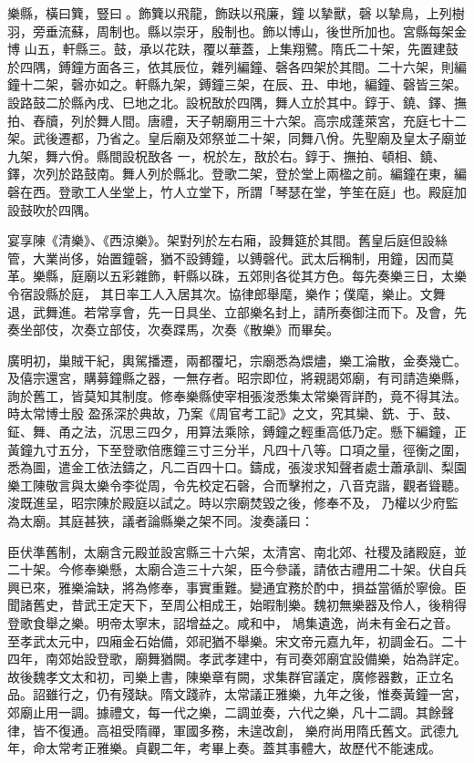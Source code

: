 \begin{pinyinscope}
 樂縣，橫曰簨，豎曰。飾簨以飛龍，飾趺以飛廉，鐘以摯獸，磬以摯鳥，上列樹羽，旁垂流蘇，周制也。縣以崇牙，殷制也。飾以博山，後世所加也。宮縣每架金博
 山五，軒縣三。鼓，承以花趺，覆以華蓋，上集翔鷺。隋氏二十架，先置建鼓於四隅，鎛鐘方面各三，依其辰位，雜列編鐘、磬各四架於其間。二十六架，則編鐘十二架，磬亦如之。軒縣九架，鎛鐘三架，在辰、丑、申地，編鐘、磬皆三架。設路鼓二於縣內戌、巳地之北。設柷敔於四隅，舞人立於其中。錞于、鐃、鐸、撫拍、舂牘，列於舞人間。唐禮，天子朝廟用三十六架。高宗成蓬萊宮，充庭七十二架。武後遷都，乃省之。皇后廟及郊祭並二十架，同舞八佾。先聖廟及皇太子廟並九架，舞六佾。縣間設柷敔各
 一，柷於左，敔於右。錞于、撫拍、頓相、鐃、鐸，次列於路鼓南。舞人列於縣北。登歌二架，登於堂上兩楹之前。編鐘在東，編磬在西。登歌工人坐堂上，竹人立堂下，所謂「琴瑟在堂，竽笙在庭」也。殿庭加設鼓吹於四隅。



 宴享陳《清樂》、《西涼樂》。架對列於左右廂，設舞筵於其間。舊皇后庭但設絲管，大業尚侈，始置鐘磬，猶不設鎛鐘，以鎛磬代。武太后稱制，用鐘，因而莫革。樂縣，庭廟以五彩雜飾，軒縣以硃，五郊則各從其方色。每先奏樂三日，太樂令宿設縣於庭，
 其日率工人入居其次。協律郎舉麾，樂作；僕麾，樂止。文舞退，武舞進。若常享會，先一日具坐、立部樂名封上，請所奏御注而下。及會，先奏坐部伎，次奏立部伎，次奏蹀馬，次奏《散樂》而畢矣。



 廣明初，巢賊干紀，輿駕播遷，兩都覆圮，宗廟悉為煨燼，樂工淪散，金奏幾亡。及僖宗還宮，購募鐘縣之器，一無存者。昭宗即位，將親謁郊廟，有司請造樂縣，詢於舊工，皆莫知其制度。修奉樂縣使宰相張浚悉集太常樂胥詳酌，竟不得其法。時太常博士殷
 盈孫深於典故，乃案《周官考工記》之文，究其欒、銑、于、鼓、鉦、舞、甬之法，沉思三四夕，用算法乘除，鎛鐘之輕重高低乃定。懸下編鐘，正黃鐘九寸五分，下至登歌倍應鐘三寸三分半，凡四十八等。口項之量，徑衡之圍，悉為圖，遣金工依法鑄之，凡二百四十口。鑄成，張浚求知聲者處士蕭承訓、梨園樂工陳敬言與太樂令李從周，令先校定石磬，合而擊拊之，八音克諧，觀者聳聽。浚既進呈，昭宗陳於殿庭以試之。時以宗廟焚毀之後，修奉不及，
 乃權以少府監為太廟。其庭甚狹，議者論縣樂之架不同。浚奏議曰：



 臣伏準舊制，太廟含元殿並設宮縣三十六架，太清宮、南北郊、社稷及諸殿庭，並二十架。今修奉樂懸，太廟合造三十六架，臣今參議，請依古禮用二十架。伏自兵興已來，雅樂淪缺，將為修奉，事實重難。變通宜務於酌中，損益當循於寧儉。臣聞諸舊史，昔武王定天下，至周公相成王，始暇制樂。魏初無樂器及伶人，後稍得登歌食舉之樂。明帝太寧末，詔增益之。咸和中，
 鳩集遺逸，尚未有金石之音。至孝武太元中，四廂金石始備，郊祀猶不舉樂。宋文帝元嘉九年，初調金石。二十四年，南郊始設登歌，廟舞猶闕。孝武孝建中，有司奏郊廟宜設備樂，始為詳定。故後魏孝文太和初，司樂上書，陳樂章有闕，求集群官議定，廣修器數，正立名品。詔雖行之，仍有殘缺。隋文踐祚，太常議正雅樂，九年之後，惟奏黃鐘一宮，郊廟止用一調。據禮文，每一代之樂，二調並奏，六代之樂，凡十二調。其餘聲律，皆不復通。高祖受隋禪，軍國多務，未遑改創，
 樂府尚用隋氏舊文。武德九年，命太常考正雅樂。貞觀二年，考畢上奏。蓋其事體大，故歷代不能速成。




\end{pinyinscope}
